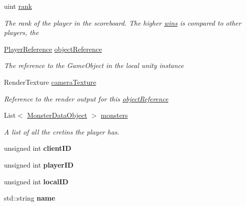 \begin{DoxyCompactItemize}
uint \hyperlink{class_game_state_1_1_player_a6cf0778cc27a824eac211b8b29b3dfcc}{rank}
\begin{DoxyCompactList}\small\item\em The rank of the player in the scoreboard. The higher \hyperlink{class_game_state_1_1_player_a3a4d13459cad9bd58e058ddc6387af70}{wins} is compared to other players, the \end{DoxyCompactList}\item 
\hyperlink{class_player_reference}{Player\-Reference} \hyperlink{class_game_state_1_1_player_aebf24de01e14055dc940d0493753484f}{object\-Reference}
\begin{DoxyCompactList}\small\item\em The reference to the Game\-Object in the local unity instance \end{DoxyCompactList}\item 
Render\-Texture \hyperlink{class_game_state_1_1_player_ac1f7e0b5bc335c32c3be71e3653787a6}{camera\-Texture}
\begin{DoxyCompactList}\small\item\em Reference to the render output for this \hyperlink{class_game_state_1_1_player_aebf24de01e14055dc940d0493753484f}{object\-Reference} \end{DoxyCompactList}\item 
List$<$ \hyperlink{class_monster_data_object}{Monster\-Data\-Object} $>$ \hyperlink{class_game_state_1_1_player_a4412b3835e68a55b00610438118cdb16}{monsters}
\begin{DoxyCompactList}\small\item\em A list of all the cretins the player has. \end{DoxyCompactList}\item 
\hypertarget{class_game_state_1_1_player_a1bef4cd92306bd5cf330c4756e63686c}{unsigned int {\bfseries client\-I\-D}}\label{class_game_state_1_1_player_a1bef4cd92306bd5cf330c4756e63686c}

\item 
\hypertarget{class_game_state_1_1_player_ac71d68698435ee1c625237b1f2b377cb}{unsigned int {\bfseries player\-I\-D}}\label{class_game_state_1_1_player_ac71d68698435ee1c625237b1f2b377cb}

\item 
\hypertarget{class_game_state_1_1_player_ab1600ee9b9d01027e5304e991be11407}{unsigned int {\bfseries local\-I\-D}}\label{class_game_state_1_1_player_ab1600ee9b9d01027e5304e991be11407}

\item 
\hypertarget{class_game_state_1_1_player_a6638478952037ab0d1b3b0a3c496a820}{std\-::string {\bfseries name}}\label{class_game_state_1_1_player_a6638478952037ab0d1b3b0a3c496a820}


\end{DoxyCompactItemize}
